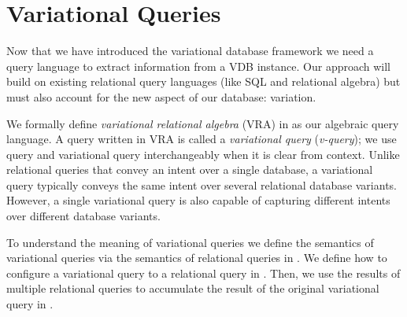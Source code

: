 \chapter{Variational Queries}
\label{ch:vql}


Now that we have introduced the variational database framework 
we need a query language to extract information from a VDB instance.
Our approach will build on existing relational query languages (like SQL and relational algebra)
but must also account for the new aspect of our database: variation. 


We formally define 
\emph{variational relational algebra} (VRA) in 
as our algebraic query language.
A query written in VRA is called a \emph{variational query} (\emph{v-query});
we use query and variational query interchangeably when it is clear from context. 
Unlike relational queries that convey an intent over a single database, 
a variational query typically conveys the same intent over several 
relational database variants. However, a single variational query is also capable of capturing different 
intents over different database variants.

To understand the meaning of variational queries
we define the semantics of variational queries via the
semantics of relational queries in . We define
how to configure a variational query to a relational query
in . Then, we use the results of multiple relational
queries to accumulate the result of the original variational query 
in .

